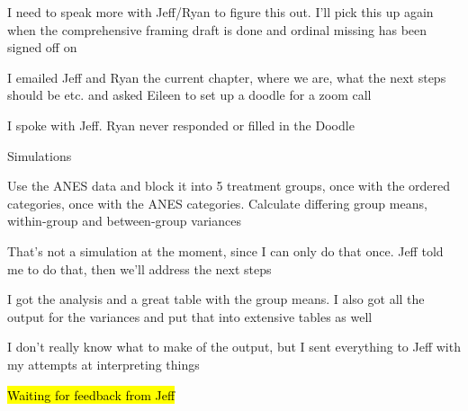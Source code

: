 \documentclass[12pt]{article}
\begin{document}
\begin{coi}
\begin{coi}
				\item I need to speak more with Jeff/Ryan to figure this out. I'll pick this up again when the comprehensive framing draft is done and ordinal missing has been signed off on
				\item I emailed Jeff and Ryan the current chapter, where we are, what the next steps should be etc. and asked Eileen to set up a doodle for a zoom call
				\item I spoke with Jeff. Ryan never responded or filled in the Doodle
			\end{coi}
		\item Simulations
			\begin{coi}
				\item Use the ANES data and block it into 5 treatment groups, once with the ordered categories, once with the ANES categories. Calculate differing group means, within-group and between-group variances
				\item That's not a simulation at the moment, since I can only do that once. Jeff told me to do that, then we'll address the next steps
				\item I got the analysis and a great table with the group means. I also got all the output for the variances and put that into extensive tables as well
				\item I don't really know what to make of the output, but I sent everything to Jeff with my attempts at interpreting things
				\item \hl{Waiting for feedback from Jeff}
			\end{coi}
	\end{coi}
	
	
\end{document}
